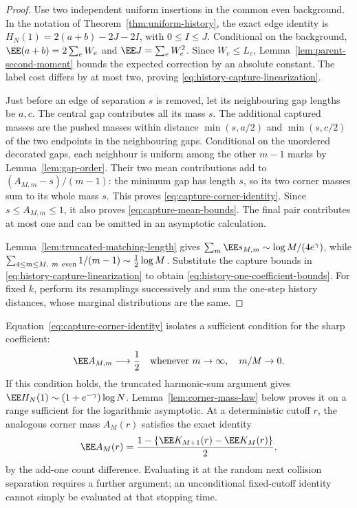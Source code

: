 \documentclass[11pt,letterpaper]{article}
\begin{document}
\begin{proof}
Use two independent uniform insertions in the common even background.
In the notation of Theorem~\ref{thm:uniform-history}, the exact edge
identity is $H_N(1)=2(a+b)-2J-2I$, with $0\le I\le J$.
Conditional on the background,
$\EE(a+b)=2\sum_eW_e$ and $\EE J=\sum_eW_e^2$.
Since $W_e\le L_e$, Lemma~\ref{lem:parent-second-moment} bounds the
expected correction by an absolute constant. The label cost differs
by at most two, proving \eqref{eq:history-capture-linearization}.

Just before an edge of separation $s$ is removed, let its neighbouring
gap lengths be $a,c$. The central gap contributes all its mass $s$.
The additional captured masses are the pushed masses within distance
$\min(s,a/2)$ and $\min(s,c/2)$ of the two endpoints in the neighbouring
gaps. Conditional on the unordered decorated gaps, each neighbour is
uniform among the other $m-1$ marks by Lemma~\ref{lem:gap-order}.
Their two mean contributions add to $(A_{M,m}-s)/(m-1)$: the minimum
gap has length $s$, so its two corner masses sum to its whole mass $s$.
This proves \eqref{eq:capture-corner-identity}. Since
$s\le A_{M,m}\le1$, it also proves \eqref{eq:capture-mean-bounds}.
The final pair contributes at most one and can be omitted in an
asymptotic calculation.

Lemma~\ref{lem:truncated-matching-length} gives
$\sum_m\EE s_{M,m}\sim\log M/(4e^\gamma)$, while
$\sum_{4\le m\le M,\ m\ {\rm even}}1/(m-1)\sim\tfrac12\log M$.
Substitute the capture bounds in
\eqref{eq:history-capture-linearization} to obtain
\eqref{eq:history-one-coefficient-bounds}.
For fixed $k$, perform its resamplings successively and sum the
one-step history distances, whose marginal distributions are the same.
\end{proof}

Equation~\eqref{eq:capture-corner-identity} isolates a sufficient
condition for the sharp coefficient:
\[
 \EE A_{M,m}\longrightarrow\frac12
 \quad\hbox{whenever }m\to\infty,\quad m/M\to0.
\]
If this condition holds, the truncated harmonic-sum argument gives
$\EE H_N(1)\sim(1+e^{-\gamma})\log N$.
Lemma~\ref{lem:corner-mass-law} below proves it on a range sufficient
for the logarithmic asymptotic. At a deterministic cutoff $r$, the
analogous corner mass $A_M(r)$ satisfies the exact identity
\[
 \EE A_M(r)=\frac{1-\{\EE K_{M+1}(r)-\EE K_M(r)\}}2,
\]
by the add-one count difference. Evaluating it at the random next
collision separation requires a further argument; an unconditional
fixed-cutoff identity cannot simply be evaluated at that stopping time.
\end{document}
